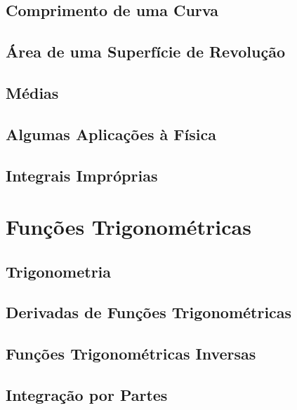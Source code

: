 \documentclass{svmono}
\begin{document}
\section{Comprimento de uma Curva}
\label{sec:curvelength}

\section{Área de uma Superfície de Revolução}
\label{sec:arearev}

\section{Médias}
\label{sec:averages}

\section{Algumas Aplicações à Física}
\label{sec:physics}

\section{Integrais Impróprias}
\label{sec:improperints}

\chapterproblems

\chapter{Funções Trigonométricas}
\label{chp:trigfunc}

\section{Trigonometria}
\label{sec:trigonometry}

\section{Derivadas de Funções Trigonométricas}
\label{sec:derivtrig}

\section{Funções Trigonométricas Inversas}
\label{sec:invtrig}

\section{Integração por Partes}
\label{sec:intparts}
\end{document}
